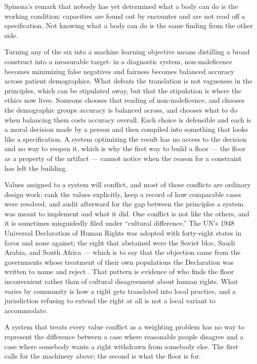 Spinoza's remark that nobody has yet determined what a body can do \autocite[III P2 Schol.]{spinoza1985collected} is the working condition: capacities are found out by encounter and are not read off a specification. Not knowing what a body can do is the same finding from the other side.

Turning any of the six into a machine learning objective means distilling a broad construct into a measurable target: in a diagnostic system, non-maleficence becomes minimizing false negatives and fairness becomes balanced accuracy across patient demographics. What defeats the translation is not vagueness in the principles, which can be stipulated away, but that the stipulation is where the ethics now lives. Someone chooses that reading of non-maleficence, and chooses the demographic groups accuracy is balanced across, and chooses what to do when balancing them costs accuracy overall. Each choice is defensible and each is a moral decision made by a person and then compiled into something that looks like a specification. A system optimizing the result has no access to the decision and no way to reopen it, which is why the first way to build a floor — the floor as a property of the artifact — cannot notice when the reason for a constraint has left the building.

Values assigned to a system will conflict, and most of those conflicts are ordinary design work: rank the values explicitly, keep a record of how comparable cases were resolved, and audit afterward for the gap between the principles a system was meant to implement and what it did. One conflict is not like the others, and it is sometimes misguidedly filed under “cultural difference.” The UN's 1948 Universal Declaration of Human Rights was adopted with forty-eight states in favor and none against; the eight that abstained were the Soviet bloc, Saudi Arabia, and South Africa — which is to say that the objection came from the governments whose treatment of their own populations the Declaration was written to name and reject \autocite{un1948udhr}. That pattern is evidence of who finds the floor inconvenient rather than of cultural disagreement about human rights. What varies by community is how a right gets translated into local practice, and a jurisdiction refusing to extend the right at all is not a local variant to accommodate.

A system that treats every value conflict as a weighting problem has no way to represent the difference between a case where reasonable people disagree and a case where somebody wants a right withdrawn from somebody else. The first calls for the machinery above; the second is what the floor is for.
